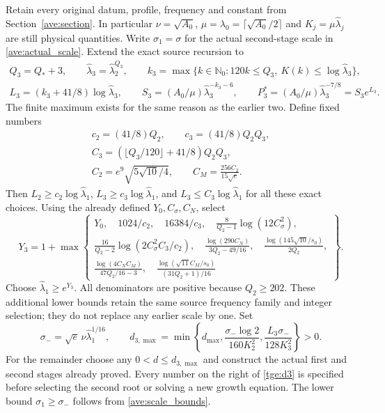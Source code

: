 Retain every original datum, profile, frequency and constant from
Section~\ref{ave:section}. In particular $\nu=\sqrt{A_0}$,
$\mu=\lambda_0=\lceil\sqrt{A_0}/2\rceil$ and
$K_j=\mu\widehat\lambda_j$ are still physical quantities.
Write $\sigma_1=\sigma$ for the actual second-stage scale in
\eqref{ave:actual_scale}. Extend the exact source recursion to
\begin{equation}\label{tge:source}
\begin{gathered}
 Q_3=Q_*+3,\qquad
 \widehat\lambda_3=\widehat\lambda_2^{Q_3},\qquad
 k_3=\max\{k\in\mathbb N_0:120k\leq Q_3,
                         \ K(k)\leq\log\widehat\lambda_3\},\\
 L_3=(k_3+41/8)\log\widehat\lambda_3,\qquad
 S_3=(A_0/\mu)\widehat\lambda_3^{-k_3-6},\qquad
 P_3^*=(A_0/\mu)\widehat\lambda_3^{-7/8}=S_3e^{L_3}.
\end{gathered}
\end{equation}
The finite maximum exists for the same reason as the earlier two.
Define fixed numbers
\begin{gather*}
 c_2=(41/8)Q_2,\qquad c_3=(41/8)Q_2Q_3,\\
 C_3=(\lfloor Q_3/120\rfloor+41/8)Q_2Q_3,\\
 C_2=e^9\sqrt{5\sqrt{10}/4},\qquad
 C_M=\frac{256C_2}{15\sqrt e}.
\end{gather*}
Then $L_2\geq c_2\log\widehat\lambda_1$,
$L_3\geq c_3\log\widehat\lambda_1$, and
$L_3\leq C_3\log\widehat\lambda_1$ for all these exact choices.
Using the already defined $Y_0,C_\sigma,C_N$, select
\begin{equation}\label{tge:Y3}
 Y_3=1+\max\left\{\begin{gathered}
 Y_0,\quad 1024/c_2,\quad 16384/c_3,\quad
 \frac8{Q_2-1}\log(12C_\sigma^2),\\
 \frac{16}{Q_2-2}\log(2C_\sigma^2C_3/c_2),\quad
 \frac{\log(290C_N)}{3Q_2-49/16},\quad
 \frac{\log(145\sqrt{10}/s_0)}{2Q_2},\\
 \frac{\log(4C_NC_M)}{47Q_2/16-3},\quad
 \frac{\log(\sqrt{11}C_M/s_0)}{(31Q_2+1)/16}
 \end{gathered}\right\}.
\end{equation}
Choose $\widehat\lambda_1\geq e^{Y_3}$.
All denominators are positive because $Q_2\geq202$.
These additional lower bounds retain the same source frequency family
and integer selection; they do not replace any earlier scale by one.
Set
\begin{equation}\label{tge:d3}
 \sigma_- =\sqrt e\,\nu\widehat\lambda_1^{1/16},\qquad
 d_{3,\max}=\min\left\{d_{\max},
      \frac{\sigma_-\log2}{160K_2^2},
      \frac{L_3\sigma_-}{128K_3^2}\right\}>0.
\end{equation}
For the remainder choose any $0<d\leq d_{3,\max}$ and construct
the actual first and second stages already proved. Every number on
the right of \eqref{tge:d3} is specified before selecting the second
root or solving a new growth equation. The lower bound
$\sigma_1\geq\sigma_-$ follows from \eqref{ave:scale_bounds}.

